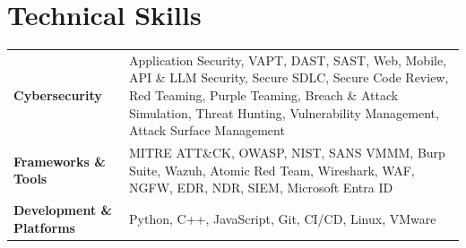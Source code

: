 \documentclass[a4paper,8pt]{article}
\begin{document}

\section{\textbf{Technical Skills}}

\begin{tabularx}{\linewidth}{ @{}l X@{} }

\textbf{Cybersecurity} & Application Security, VAPT, DAST, SAST, Web, Mobile, API \& LLM Security, Secure SDLC, Secure Code Review, Red Teaming, Purple Teaming, Breach \& Attack Simulation, Threat Hunting, Vulnerability Management, Attack Surface Management \\[2pt]

\textbf{Frameworks \& Tools} & MITRE ATT\&CK, OWASP, NIST, SANS VMMM, Burp Suite, Wazuh, Atomic Red Team, Wireshark, WAF, NGFW, EDR, NDR, SIEM, Microsoft Entra ID \\[2pt]

\textbf{Development \& Platforms} & Python, C++, JavaScript, Git, CI/CD, Linux, VMware \\

\end{tabularx}


\end{document}
